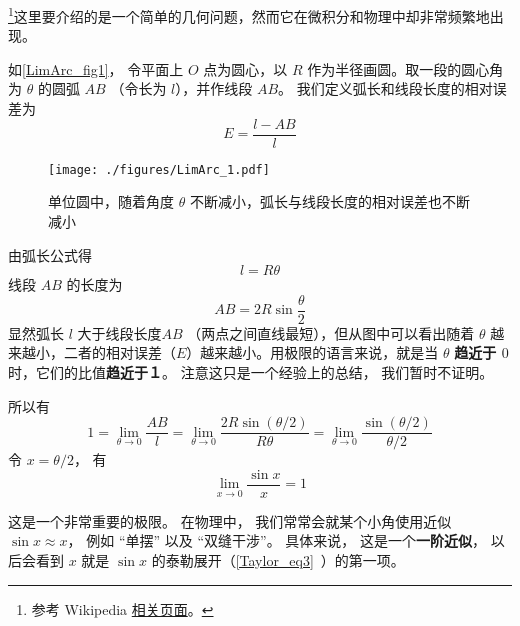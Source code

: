 

\footnote{参考 Wikipedia \href{https://en.wikipedia.org/wiki/Small-angle_approximation}{相关页面}。}这里要介绍的是一个简单的几何问题，然而它在微积分和物理中却非常频繁地出现。

如\autoref{LimArc_fig1}， 令平面上 $O$ 点为圆心，以 $R$ 作为半径画圆。取一段的圆心角为 $\theta $ 的圆弧 $AB$ （令长为 $l$），并作线段 $AB$。 我们定义弧长和线段长度的相对误差为
\begin{equation}
E = \frac{l - AB}{l}
\end{equation}

\begin{figure}[ht]
\centering
\texttt{[image: ./figures/LimArc\_1.pdf]}
\caption{单位圆中，随着角度 $\theta$ 不断减小，弧长与线段长度的相对误差也不断减小}\label{LimArc_fig1}
\end{figure}

由弧长公式得
\begin{equation} \label{LimArc_eq1}
l = R\theta 
\end{equation}
线段 $AB$ 的长度为
\begin{equation}\label{LimArc_eq2}
AB = 2R\sin \frac{\theta }{2}
\end{equation}
显然弧长 $l$ 大于线段长度$AB$ （两点之间直线最短），但从图中可以看出随着 $\theta $ 越来越小，二者的相对误差（$E$）越来越小。用极限的语言来说，就是当 $\theta $ \textbf{趋近于 $0$ } 时，它们的比值\textbf{趋近于１}。 注意这只是一个经验上的总结， 我们暂时不证明。

所以有
\begin{equation}
1=\lim_{\theta\to 0} \frac{AB}{l} = \lim_{\theta\to 0} \frac{2R\sin (\theta/2)}{R\theta} 
= \lim_{\theta\to 0}\frac{\sin (\theta/2)}{\theta/2}
\end{equation}
令 $x = \theta/2$， 有
\begin{equation}
\lim_{x\to 0} \frac{\sin x}{x} = 1
\end{equation}

这是一个非常重要的极限。 在物理中， 我们常常会就某个小角使用近似 $\sin x \approx x$， 例如 “单摆” 以及 “双缝干涉”。 具体来说， 这是一个\textbf{一阶近似}，  以后会看到 $x$ 就是 $\sin x$ 的泰勒展开（\autoref{Taylor_eq3}~）的第一项。

